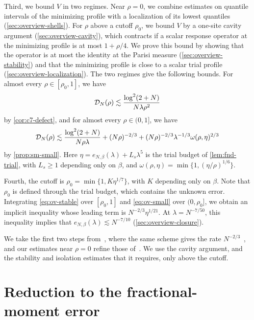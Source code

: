 Third, we bound $V$ in two regimes. Near $\rho=0$, we combine estimates
on quantile intervals of the minimizing profile with a localization of
its lowest quantiles (\cref{sec:overview-shells}). For
$\rho$ above a cutoff $\rho_0$, we bound $V$ by a one-site cavity argument
(\cref{sec:overview-cavity}), which contracts if a scalar response
operator at the minimizing profile is at most $1+\rho/4$. We prove this
bound by showing that the operator is at most the identity at the Parisi
measure (\cref{sec:overview-stability}) and that the minimizing profile
is close to a scalar trial profile (\cref{sec:overview-localization}).
The two regimes give the following bounds. For almost every
$\rho\in[\rho_0,1]$, we have
\begin{equation}\label{eq:ov-stable}
 \mathcal D_N(\rho)\lesssim\frac{\log^2(2+N)}{N\lambda\rho^2}
\end{equation}
by \cref{cor:c7-defect}, and for almost every $\rho\in(0,1]$, we have
\begin{equation}\label{eq:ov-small}
 \mathcal D_N(\rho)\lesssim\frac{\log^2(2+N)}{N\rho\lambda}+(N\rho)^{-2/3}
 +(N\rho)^{-2/3}\lambda^{-1/3}\omega(\rho,\eta)^{2/3}
\end{equation}
by \cref{prop:sm-small}. Here $\eta=e_{N,\beta}(\lambda)+L_s\lambda^5$
is the trial budget of \cref{lem:fnd-trial}, with $L_s\ge1$ depending
only on $\beta$, and $\omega(\rho,\eta)=\min\{1,(\eta/\rho)^{1/6}\}$.

Fourth, the cutoff is $\rho_0=\min\{1,K\eta^{1/7}\}$, with $K$
depending only on $\beta$. Note that $\rho_0$ is defined through the
trial budget, which contains the unknown error. Integrating
\eqref{eq:ov-stable} over $[\rho_0,1]$ and \eqref{eq:ov-small} over
$(0,\rho_0]$, we obtain an implicit inequality whose leading term is
$N^{-2/3}\eta^{1/21}$. At $\lambda=N^{-7/50}$, this inequality
implies that $e_{N,\beta}(\lambda)\lesssim N^{-7/10}$
(\cref{sec:overview-closure}).

We take the first two steps from~\cite{AL}, where the same scheme
gives the rate $N^{-2/3}$~\cite[Theorem~1.4]{AL}, and our estimates
near $\rho=0$ refine those of~\cite[Sections~3 and~7]{AL}. We use the
cavity argument, and the stability and isolation estimates that it
requires, only above the cutoff.

\section{Reduction to the fractional-moment error}
\label{sec:overview-reduction}


